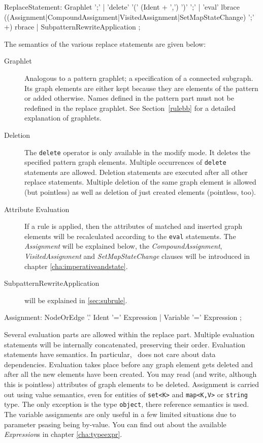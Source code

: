 \begin{rail}  
  ReplaceStatement:
    Graphlet ';' |
    'delete' '(' (Ident + ',') ')' ';' |
    'eval' lbrace ((Assignment|CompoundAssignment|VisitedAssignment|SetMapStateChange) ';' +) rbrace |
    SubpatternRewriteApplication
    ;
\end{rail}\label{replstmt}
The semantics of the various replace statements are given below:
\begin{description}
  \item[Graphlet] Analogous to a pattern graphlet; a specification of a connected subgraph. Its graph elements are either kept because they are elements of the pattern or added otherwise. Names defined in the pattern part must not be redefined in the replace graphlet. See Section~\ref{rulebb} for a detailed explanation of graphlets. 
  \item[Deletion] The \texttt{delete} operator is only available in the modify mode. It deletes the specified pattern graph elements. Multiple occurrences of \texttt{delete} statements are allowed. Deletion statements are executed after all other replace statements. Multiple deletion of the same graph element is allowed (but pointless) as well as deletion of just created elements (pointless, too).
  \item[Attribute Evaluation] If a rule is applied, then the attributes of matched and inserted graph elements will be recalculated according to the \texttt{eval} statements. The \emph{Assignment} will be explained below, the \emph{CompoundAssignment}, \emph{VisitedAssignment} and \emph{SetMapStateChange} clauses will be introduced in chapter \ref{cha:imperativeandstate}.
  \item[SubpatternRewriteApplication] will be explained in \ref{sec:subrule}.
\end{description} 

\begin{rail}    
  Assignment:
	  NodeOrEdge '.' Ident '=' Expression |
	  Variable '=' Expression
	;
\end{rail}
Several evaluation parts are allowed within the replace part. 
Multiple evaluation statements will be internally concatenated, preserving their order.
Evaluation statements have  semantics.
In particular, \GrG\ does not care about data dependencies.
Evaluation takes place before any graph element gets deleted and after all the new elements have been created.
You may read (and write, although this is pointless) attributes of graph elements to be deleted.
Assignment is carried out using value semantics, even for entities of \verb#set<K># and \verb#map<K,V># or \texttt{string} type.
The only exception is the type \texttt{object}, there reference semantics is used.
The variable assignments are only useful in a few limited situations due to parameter psasing being by-value.
You can find out about the available \emph{Expression}s in chapter \ref{cha:typeexpr}.

